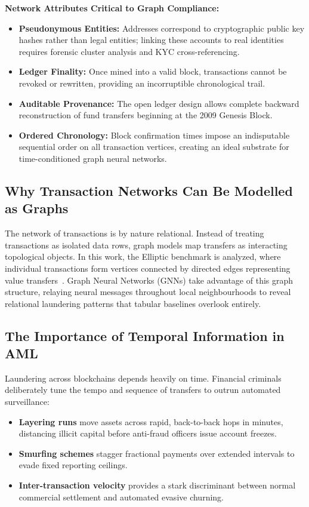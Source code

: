 \vspace{0.5em}
\noindent
\textbf{Network Attributes Critical to Graph Compliance:}
\begin{itemize}
	\item \textbf{Pseudonymous Entities:} Addresses correspond to cryptographic public key hashes rather than legal entities; linking these accounts to real identities requires forensic cluster analysis and KYC cross-referencing.
	\item \textbf{Ledger Finality:} Once mined into a valid block, transactions cannot be revoked or rewritten, providing an incorruptible chronological trail.
	\item \textbf{Auditable Provenance:} The open ledger design allows complete backward reconstruction of fund transfers beginning at the 2009 Genesis Block.
	\item \textbf{Ordered Chronology:} Block confirmation times impose an indisputable sequential order on all transaction vertices, creating an ideal substrate for time-conditioned graph neural networks.
\end{itemize}

\subsection{Why Transaction Networks Can Be Modelled as Graphs}

The network of transactions is by nature relational. Instead of treating transactions as isolated data rows, graph models map transfers as interacting topological objects. In this work, the Elliptic benchmark is analyzed, where individual transactions form vertices connected by directed edges representing value transfers~\cite{elliptic2019}. Graph Neural Networks (GNNs) take advantage of this graph structure, relaying neural messages throughout local neighbourhoods to reveal relational laundering patterns that tabular baselines overlook entirely.

\subsection{The Importance of Temporal Information in AML}

Laundering across blockchains depends heavily on time. Financial criminals deliberately tune the tempo and sequence of transfers to outrun automated surveillance:
\begin{itemize}
	\item \textbf{Layering runs} move assets across rapid, back-to-back hops in minutes, distancing illicit capital before anti-fraud officers issue account freezes.
	\item \textbf{Smurfing schemes} stagger fractional payments over extended intervals to evade fixed reporting ceilings.
	\item \textbf{Inter-transaction velocity} provides a stark discriminant between normal commercial settlement and automated evasive churning.
\end{itemize}

